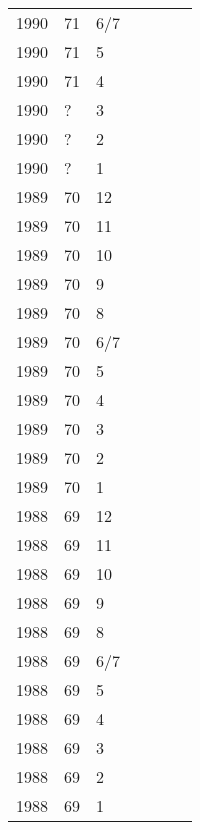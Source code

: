 \begin{longtable}{ |l|l|l|l|p{2.7cm}|l|p{2cm}| }
 1990 & 71 &   6/7 &         &                &  & \\
 1990 & 71 &     5 &         &                &   & \\
 1990 & 71 &     4 &         &                &  & \\
 1990 & ?  &     3 &         &                &  & \\
 1990 & ?  &     2 &         &                &  & \\
 1990 & ?  &     1 &         &                &  & \\
 1989 & 70 &    12 &         &                &   & \\
 1989 & 70 &    11 &         &                &  & \\
 1989 & 70 &    10 &         &                &  & \\
 1989 & 70 &     9 &         &                &  & \\
 1989 & 70 &     8 &         &                &  & \\
 1989 & 70 &   6/7 &         &                &  & \\
 1989 & 70 &     5 &         &                &  & \\
 1989 & 70 &     4 &         &                &  & \\
 1989 & 70 &     3 &         &                &  & \\
 1989 & 70 &     2 &         &                &  & \\
 1989 & 70 &     1 &         &                &  & \\
 1988 & 69 &    12 &         &                &  & \\
 1988 & 69 &    11 &         &                &  & \\
 1988 & 69 &    10 &         &                &  & \\
 1988 & 69 &     9 &         &                &  & \\
 1988 & 69 &     8 &         &                &  & \\
 1988 & 69 &   6/7 &         &                &  & \\
 1988 & 69 &     5 &         &                &  & \\
 1988 & 69 &     4 &         &                &  & \\
 1988 & 69 &     3 &         &                &  & \\
 1988 & 69 &     2 &         &                &  & \\
 1988 & 69 &     1 &         &                &  & \\

\end{longtable}

